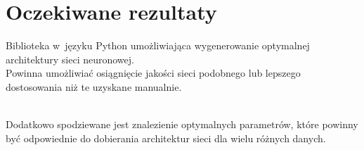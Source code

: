 \documentclass[a4paper, 11pt]{article}
\begin{document}
\section{Oczekiwane rezultaty}
Biblioteka w~języku Python umożliwiająca wygenerowanie optymalnej
architektury sieci neuronowej.\\
Powinna umożliwiać osiągnięcie jakości sieci podobnego
lub lepszego dostosowania niż te uzyskane manualnie.

\noindent\\
Dodatkowo spodziewane jest znalezienie optymalnych parametrów,
które powinny być odpowiednie do dobierania architektur sieci dla wielu różnych danych.
\end{document}
